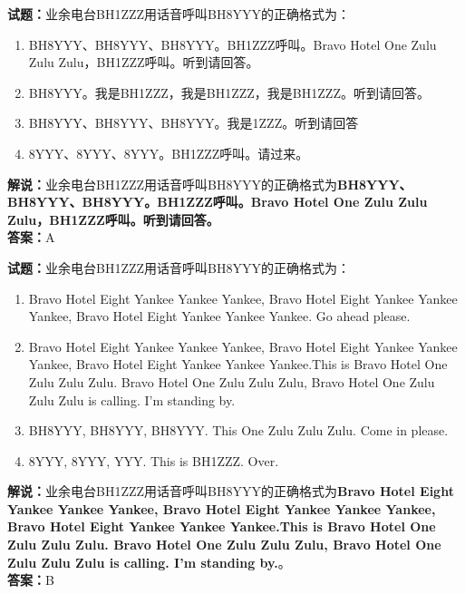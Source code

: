 \documentclass{ctexbook}
\begin{document}
\vspace{\baselineskip}

\noindent\textbf{试题：}业余电台BH1ZZZ用话音呼叫BH8YYY的正确格式为：
\begin{enumerate}[leftmargin=3em]
  \item BH8YYY、BH8YYY、BH8YYY。BH1ZZZ呼叫。Bravo Hotel One Zulu Zulu Zulu，BH1ZZZ呼叫。听到请回答。
  \item BH8YYY。我是BH1ZZZ，我是BH1ZZZ，我是BH1ZZZ。听到请回答。
  \item BH8YYY、BH8YYY、BH8YYY。我是1ZZZ。听到请回答
  \item 8YYY、8YYY、8YYY。BH1ZZZ呼叫。请过来。
\end{enumerate}
\noindent\textbf{解说：}业余电台BH1ZZZ用话音呼叫BH8YYY的正确格式为\textbf{BH8YYY、BH8YYY、BH8YYY。BH1ZZZ呼叫。Bravo Hotel One Zulu Zulu Zulu，BH1ZZZ呼叫。听到请回答。}\\\noindent\textbf{答案：}A

\vspace{\baselineskip}

\noindent\textbf{试题：}业余电台BH1ZZZ用话音呼叫BH8YYY的正确格式为：
\begin{enumerate}[leftmargin=3em]
  \item Bravo Hotel Eight Yankee Yankee Yankee, Bravo Hotel Eight Yankee Yankee Yankee, Bravo Hotel Eight Yankee Yankee Yankee. Go ahead please.
  \item Bravo Hotel Eight Yankee Yankee Yankee, Bravo Hotel Eight Yankee Yankee Yankee, Bravo Hotel Eight Yankee Yankee Yankee.This is Bravo Hotel One Zulu Zulu Zulu. Bravo Hotel One Zulu Zulu Zulu, Bravo Hotel One Zulu Zulu Zulu is calling. I’m standing by.
  \item BH8YYY, BH8YYY, BH8YYY. This One Zulu Zulu Zulu. Come in please.
  \item 8YYY, 8YYY, YYY. This is BH1ZZZ. Over.
\end{enumerate}
\noindent\textbf{解说：}业余电台BH1ZZZ用话音呼叫BH8YYY的正确格式为\textbf{Bravo Hotel Eight Yankee Yankee Yankee, Bravo Hotel Eight Yankee Yankee Yankee, Bravo Hotel Eight Yankee Yankee Yankee.This is Bravo Hotel One Zulu Zulu Zulu. Bravo Hotel One Zulu Zulu Zulu, Bravo Hotel One Zulu Zulu Zulu is calling. I’m standing by.}。\\\noindent\textbf{答案：}B

\vspace{\baselineskip}
\end{document}
